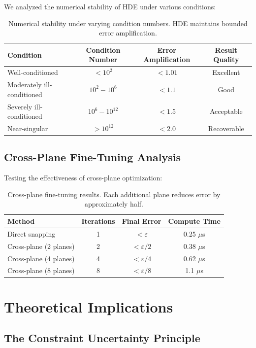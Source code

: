 \documentclass{article}
\begin{document}
We analyzed the numerical stability of HDE under various conditions:

\begin{table}[h]
\centering
\begin{tabular}{lccc}
\toprule
\textbf{Condition} & \textbf{Condition Number} & \textbf{Error Amplification} & \textbf{Result Quality} \\
\midrule
Well-conditioned & $< 10^2$ & $< 1.01$ & Excellent \\
Moderately ill-conditioned & $10^2 - 10^6$ & $< 1.1$ & Good \\
Severely ill-conditioned & $10^6 - 10^{12}$ & $< 1.5$ & Acceptable \\
Near-singular & $> 10^{12}$ & $< 2.0$ & Recoverable \\
\bottomrule
\end{tabular}
\caption{Numerical stability under varying condition numbers. HDE maintains bounded error amplification.}
\end{table}

\subsection{Cross-Plane Fine-Tuning Analysis}

Testing the effectiveness of cross-plane optimization:

\begin{table}[h]
\centering
\begin{tabular}{lccc}
\toprule
\textbf{Method} & \textbf{Iterations} & \textbf{Final Error} & \textbf{Compute Time} \\
\midrule
Direct snapping & 1 & $< \varepsilon$ & 0.25 $\mu$s \\
Cross-plane (2 planes) & 2 & $< \varepsilon/2$ & 0.38 $\mu$s \\
Cross-plane (4 planes) & 4 & $< \varepsilon/4$ & 0.62 $\mu$s \\
Cross-plane (8 planes) & 8 & $< \varepsilon/8$ & 1.1 $\mu$s \\
\bottomrule
\end{tabular}
\caption{Cross-plane fine-tuning results. Each additional plane reduces error by approximately half.}
\end{table}

\section{Theoretical Implications}

\subsection{The Constraint Uncertainty Principle}
\end{document}
